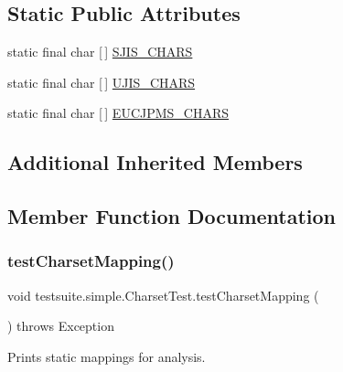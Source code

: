 \subsection*{Static Public Attributes}
\begin{DoxyCompactItemize}
\item 
static final char \mbox{[}$\,$\mbox{]} \mbox{\hyperlink{classtestsuite_1_1simple_1_1_charset_test_aea9e321b4ce55b3fe366d39ac69da267}{S\+J\+I\+S\+\_\+\+C\+H\+A\+RS}}
\item 
static final char \mbox{[}$\,$\mbox{]} \mbox{\hyperlink{classtestsuite_1_1simple_1_1_charset_test_afdb55a8c00071fb31c3b37c660d8ba3c}{U\+J\+I\+S\+\_\+\+C\+H\+A\+RS}}
\item 
static final char \mbox{[}$\,$\mbox{]} \mbox{\hyperlink{classtestsuite_1_1simple_1_1_charset_test_aa9c89e77068a2f7b4361d9dd6b00f5ac}{E\+U\+C\+J\+P\+M\+S\+\_\+\+C\+H\+A\+RS}}
\end{DoxyCompactItemize}
\subsection*{Additional Inherited Members}


\subsection{Member Function Documentation}
\mbox{\label{classtestsuite_1_1simple_1_1_charset_test_ace6046bed9bc3e29734e98003258fd58}} 
\subsubsection{\texorpdfstring{test\+Charset\+Mapping()}{testCharsetMapping()}}
{\footnotesize\ttfamily void testsuite.\+simple.\+Charset\+Test.\+test\+Charset\+Mapping (\begin{DoxyParamCaption}{ }\end{DoxyParamCaption}) throws Exception}

Prints static mappings for analysis.


